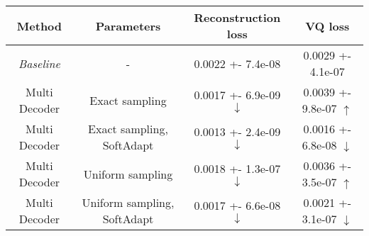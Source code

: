 \centering
\scriptsize
\begin{tabular}{||c|c|c|c||}
\hline
 Method & Parameters & Reconstruction loss & VQ loss \\
\hline
\textit{Baseline} & - & 0.0022 +- 7.4e-08 & 0.0029 +- 4.1e-07 \\
\hline
Multi Decoder & Exact sampling & 0.0017 +- 6.9e-09  $\downarrow$ & 0.0039 +- 9.8e-07  $\uparrow$ \\
\hline
Multi Decoder & Exact sampling, SoftAdapt & 0.0013 +- 2.4e-09  $\downarrow$ & 0.0016 +- 6.8e-08  $\downarrow$ \\
\hline
Multi Decoder & Uniform sampling & 0.0018 +- 1.3e-07  $\downarrow$ & 0.0036 +- 3.5e-07  $\uparrow$ \\
\hline
Multi Decoder & Uniform sampling, SoftAdapt & 0.0017 +- 6.6e-08  $\downarrow$ & 0.0021 +- 3.1e-07  $\downarrow$ \\
\hline
\end{tabular}
